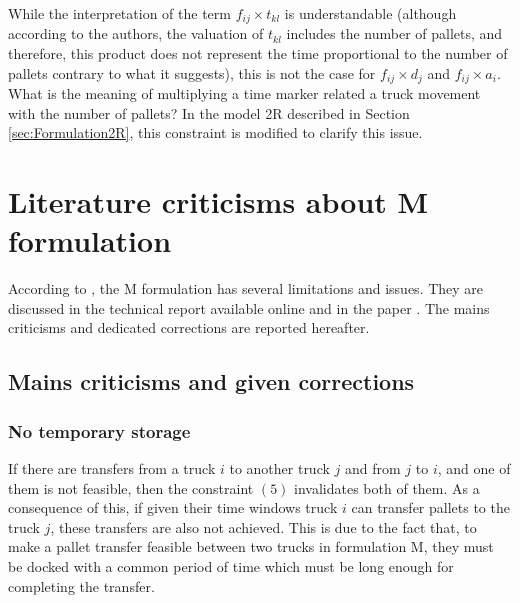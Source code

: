 \documentclass[preprint,12pt,authoryear]{elsarticle}
\begin{document}
%
While the interpretation of the term $f_{ij} \times t_{kl}$ is understandable (although according to the authors, the valuation of $t_{kl}$ includes the number of pallets, and therefore, this product does not represent the time proportional to the number of pallets contrary to what it suggests), this is not the case for $f_{ij} \times d_j$ and $f_{ij} \times a_i$. 
What is the meaning of multiplying a time marker related a truck movement with the number of pallets? In the model 2R described in Section \ref{sec:Formulation2R}, this constraint is modified to clarify this issue. 


%
%
\section{Literature criticisms about M formulation}

According to \citet{Gelareh2015,Gelareh2021}, the M formulation has several limitations and issues.
%
They are discussed in the technical report \cite{Gelareh2015} available online and in the paper \cite{Gelareh2021}. The mains criticisms and dedicated corrections are reported hereafter.

%
%
\subsection{Mains criticisms and given corrections}

%
%
\subsubsection{No temporary storage}\label{sec:temporary storage}
If there are transfers from a truck $i$ to another truck $j$ and from $j$ to $i$, and one of them is not feasible, then the constraint $(5)$ invalidates both of them.
%
As a consequence of this, if given their time windows truck $i$ can transfer pallets to the truck $j$, these transfers are also not achieved.
%
This is due to the fact that, to make a pallet transfer feasible between two trucks in formulation M, they must be docked with a common period of time which must be long enough for completing the transfer.
\end{document}
